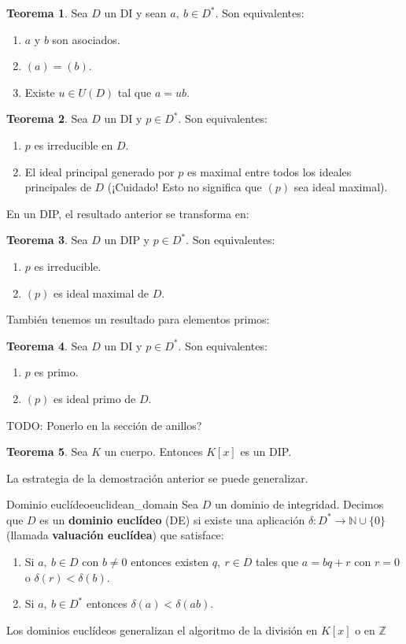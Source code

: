 \documentclass[a4paper]{book}
\theoremstyle{definition}
\newtheorem{theorem}{Teorema}[section]
\theoremstyle{ejemplo}
\theoremstyle{demostracion}
\newcommand{\enteros}{\mathbb{Z}}
\newcommand{\naturales}{\mathbb{N}}
\begin{document}
\begin{theorem}
	Sea $D$ un DI y sean $a,\ b \in D^*$. Son equivalentes:
	\begin{enumerate}
		\item
		$a$ y $b$ son asociados.
		\item
		$(a) = (b)$.
		\item
		Existe $u \in U(D)$ tal que $a = ub$.
	\end{enumerate}
\end{theorem}

\begin{theorem}
	Sea $D$ un DI y $p \in D^*$. Son equivalentes:
	\begin{enumerate}
		\item
		$p$ es irreducible en $D$.
		\item
		El ideal principal generado por $p$ es maximal entre todos los ideales principales de $D$ (¡Cuidado! Esto no significa que $(p)$ sea ideal maximal).
	\end{enumerate}
\end{theorem}
En un DIP, el resultado anterior se transforma en:
\begin{theorem}
	Sea $D$ un DIP y $p \in D^*$. Son equivalentes:
	\begin{enumerate}
		\item
		$p$ es irreducible.
		\item
		$(p)$ es ideal maximal de $D$.
	\end{enumerate}
\end{theorem}

También tenemos un resultado para elementos primos:
\begin{theorem}
	Sea $D$ un DI y $p \in D^*$. Son equivalentes:
	\begin{enumerate}
		\item
		$p$ es primo.
		\item
		$(p)$ es ideal primo de $D$.
	\end{enumerate}
\end{theorem}

TODO: Ponerlo en la sección de anillos?
\begin{theorem}
	Sea $K$ un cuerpo. Entonces $K[x]$ es un DIP.
\end{theorem}

La estrategia de la demostración anterior se puede generalizar.

\begin{define}{Dominio euclídeo}{euclidean_domain}
	Sea $D$ un dominio de integridad. Decimos que $D$ es un \textbf{dominio euclídeo} (DE) si existe una aplicación $\delta: D^* \rightarrow \naturales \cup \{ 0 \}$ (llamada \textbf{valuación euclídea}) que satisface:
	\begin{enumerate}
		\item
		Si $a,\ b \in D$ con $b \neq 0$ entonces existen $q,\ r \in D$ tales que $a = bq + r$ con $r = 0$ o $\delta(r) < \delta(b)$.
		\item
		Si $a,\ b \in D^*$ entonces $\delta(a) < \delta(ab)$.
	\end{enumerate}
\end{define}
Los dominios euclídeos generalizan el algoritmo de la división en $K[x]$ o en $\enteros$
\end{document}
